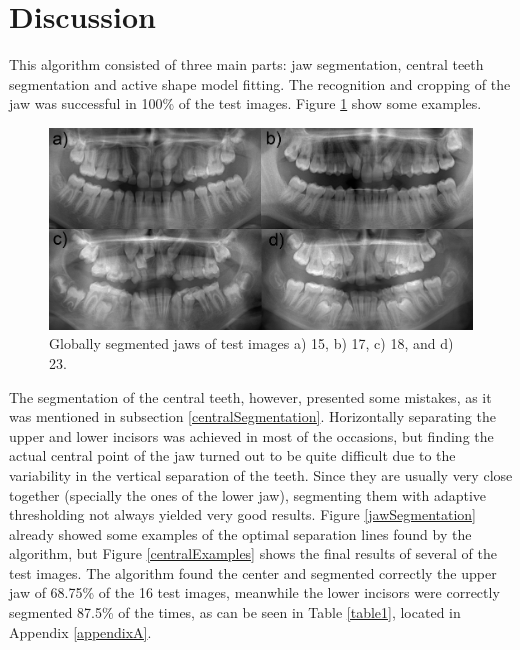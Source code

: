 \documentclass[a4paper,11pt,twoside]{article}
\begin{document}
\section{Discussion}\label{discussion}

This algorithm consisted of three main parts: jaw segmentation, central teeth segmentation and active shape model fitting. The recognition and cropping of the jaw was successful in 100\% of the test images. Figure \ref{jaws} show some examples. 

\begin{figure}
\centering
\includegraphics[width=0.95\columnwidth]{jaws.jpg}
\caption{Globally segmented jaws of test images a) 15, b) 17, c) 18, and d) 23.}
\label{jaws}
\end{figure}

The segmentation of the central teeth, however, presented some mistakes, as it was mentioned in subsection \ref{centralSegmentation}. Horizontally separating the upper and lower incisors was achieved in most of the occasions, but finding the actual central point of the jaw turned out to be quite difficult due to the variability in the vertical separation of the teeth. Since they are usually very close together (specially the ones of the lower jaw), segmenting them with adaptive thresholding not always yielded very good results. Figure \ref{jawSegmentation} already showed some examples of the optimal separation lines found by the algorithm, but Figure \ref{centralExamples} shows the final results of several of the test images. The algorithm found the center and segmented correctly the upper jaw of 68.75\% of the 16 test images, meanwhile the lower incisors were correctly segmented 87.5\% of the times, as can be seen in Table \ref{table1}, located in Appendix \ref{appendixA}.
\end{document}
